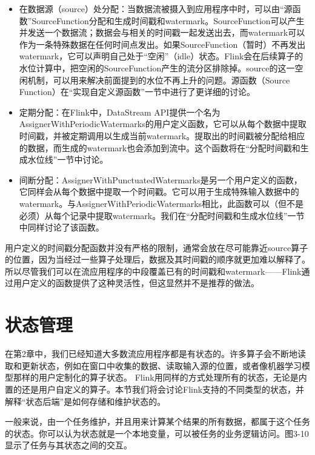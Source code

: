 \documentclass[cn,11pt,chinese]{elegantbook}
\providecommand{\tightlist}{%
  \setlength{\itemsep}{0pt}\setlength{\parskip}{0pt}}
\begin{document}
\begin{itemize}
\tightlist
\item
  在数据源（source）处分配：当数据流被摄入到应用程序中时，可以由``源函数''SourceFunction分配和生成时间戳和watermark。SourceFunction可以产生并发送一个数据流；数据会与相关的时间戳一起发送出去，而watermark可以作为一条特殊数据在任何时间点发出。如果SourceFunction（暂时）不再发出watermark，它可以声明自己处于``空闲''（idle）状态。Flink会在后续算子的水位计算中，把空闲的SourceFunction产生的流分区排除掉。source的这一空闲机制，可以用来解决前面提到的水位不再上升的问题。源函数（Source
  Function）在``实现自定义源函数''一节中进行了更详细的讨论。
\item
  定期分配：在Flink中，DataStream
  API提供一个名为AssignerWithPeriodicWatermarks的用户定义函数，它可以从每个数据中提取时间戳，并被定期调用以生成当前watermark。提取出的时间戳被分配给相应的数据，而生成的watermark也会添加到流中。这个函数将在``分配时间戳和生成水位线''一节中讨论。
\item
  间断分配：AssignerWithPunctuatedWatermarks是另一个用户定义的函数，它同样会从每个数据中提取一个时间戳。它可以用于生成特殊输入数据中的watermark。与AssignerWithPeriodicWatermarks相比，此函数可以（但不是必须）从每个记录中提取watermark。我们在``分配时间戳和生成水位线''一节中同样讨论了该函数。
\end{itemize}

用户定义的时间戳分配函数并没有严格的限制，通常会放在尽可能靠近source算子的位置，因为当经过一些算子处理后，数据及其时间戳的顺序就更加难以解释了。所以尽管我们可以在流应用程序的中段覆盖已有的时间戳和watermark------Flink通过用户定义的函数提供了这种灵活性，但这显然并不是推荐的做法。

\hypertarget{ux72b6ux6001ux7ba1ux7406}{%
\section{状态管理}\label{ux72b6ux6001ux7ba1ux7406}}

在第2章中，我们已经知道大多数流应用程序都是有状态的。许多算子会不断地读取和更新状态，例如在窗口中收集的数据、读取输入源的位置，或者像机器学习模型那样的用户定制化的算子状态。
Flink用同样的方式处理所有的状态，无论是内置的还是用户自定义的算子。本节我们将会讨论Flink支持的不同类型的状态，并解释``状态后端''是如何存储和维护状态的。

一般来说，由一个任务维护，并且用来计算某个结果的所有数据，都属于这个任务的状态。你可以认为状态就是一个本地变量，可以被任务的业务逻辑访问。图3-10显示了任务与其状态之间的交互。
\end{document}
